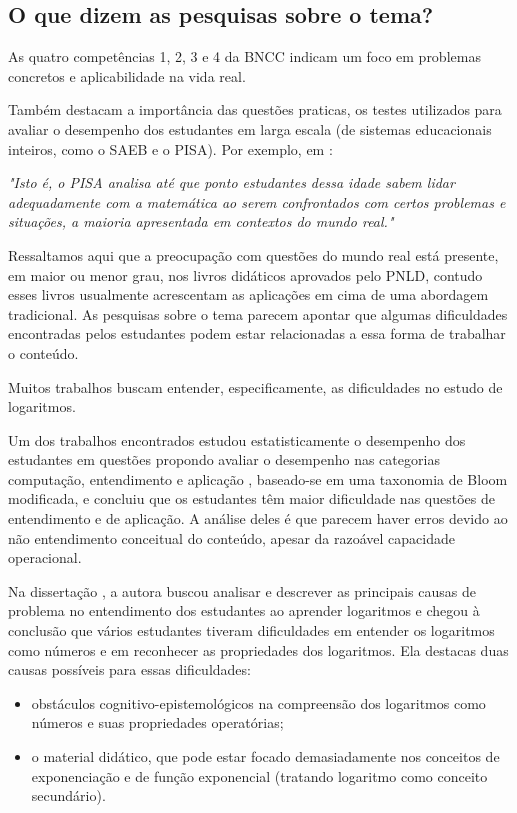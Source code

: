 \begin{apresentacao}
\section*{O que dizem as pesquisas sobre o tema?}

As quatro competências 1, 2, 3 e 4 da BNCC \cite{BNCC2018}  indicam um foco em problemas concretos e aplicabilidade na vida real. 

Também destacam a importância das questões praticas, os testes utilizados para avaliar o desempenho dos estudantes em larga escala (de sistemas educacionais inteiros, como o SAEB e o PISA). Por exemplo, em \cite[p.139]{OCDE2016}:

\textit{"Isto é, o PISA analisa até que ponto estudantes dessa idade sabem lidar adequadamente com a matemática ao serem confrontados com certos problemas e situações, a maioria apresentada em contextos do mundo real."}


Ressaltamos aqui que a preocupação com questões do mundo real está presente, em maior ou menor grau, nos livros didáticos aprovados pelo PNLD, contudo esses livros usualmente acrescentam as aplicações em cima de uma abordagem tradicional. As pesquisas sobre o tema parecem apontar que algumas dificuldades encontradas pelos estudantes podem estar relacionadas a essa forma de trabalhar o conteúdo.



	Muitos trabalhos buscam entender, especificamente, as dificuldades no estudo de logaritmos.
	 
	Um dos trabalhos encontrados \cite{Liang2005} estudou estatisticamente o desempenho dos estudantes em questões propondo avaliar o desempenho nas categorias computação, entendimento e aplicação , baseado-se em uma taxonomia de Bloom modificada, e concluiu que os estudantes têm maior dificuldade nas questões de entendimento e de aplicação. A análise deles é que parecem haver erros devido ao não entendimento conceitual do conteúdo, apesar da razoável capacidade operacional.

Na dissertação \cite{Berezovski2004}, a autora buscou analisar e descrever as principais causas de problema no entendimento dos estudantes ao aprender logaritmos e chegou à conclusão que vários estudantes tiveram dificuldades em entender os logaritmos como números e em reconhecer as propriedades dos logaritmos. Ela destacas duas causas possíveis para essas dificuldades:
	\begin{itemize}
	\item obstáculos cognitivo-epistemológicos na compreensão dos logaritmos como números e suas propriedades operatórias;
	\item o material didático, que pode estar focado demasiadamente nos conceitos de exponenciação e de função exponencial (tratando logaritmo como conceito secundário).
	\end{itemize}


\end{apresentacao}
